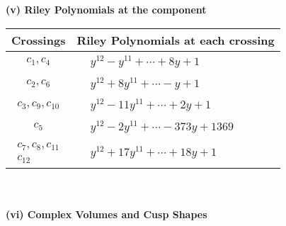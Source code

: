 \documentclass[1p]{elsarticle_modified}
\theoremstyle{definition}
\begin{document}
\newpage\renewcommand{\arraystretch}{1}
\flushleft \textbf{(v) Riley Polynomials at the component}\newline \\
\begin{tabular}{m{50pt}|m{274pt}}
Crossings & \hspace{64pt}Riley Polynomials at each crossing \\
\hline $$\begin{aligned}c_{1},c_{4}\end{aligned}$$&$\begin{aligned}
&y^{12}- y^{11}+\cdots+8 y+1
\end{aligned}$\\
\hline $$\begin{aligned}c_{2},c_{6}\end{aligned}$$&$\begin{aligned}
&y^{12}+8 y^{11}+\cdots- y+1
\end{aligned}$\\
\hline $$\begin{aligned}c_{3},c_{9},c_{10}\end{aligned}$$&$\begin{aligned}
&y^{12}-11 y^{11}+\cdots+2 y+1
\end{aligned}$\\
\hline $$\begin{aligned}c_{5}\end{aligned}$$&$\begin{aligned}
&y^{12}-2 y^{11}+\cdots-373 y+1369
\end{aligned}$\\
\hline $$\begin{aligned}c_{7},c_{8},c_{11}\\c_{12}\end{aligned}$$&$\begin{aligned}
&y^{12}+17 y^{11}+\cdots+18 y+1
\end{aligned}$\\
\hline
\end{tabular}\\~\\
\newpage\flushleft \textbf{(vi) Complex Volumes and Cusp Shapes}
\end{document}
